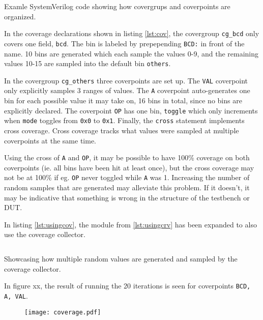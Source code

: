 \documentclass[journal]{IEEEtran}
\begin{document}
\begin{listing}[htbp]
\inputminted{systemverilog}{snippets/Cover.svh}
\caption{Examle SystemVerilog code showing how covergrups and coverpoints are organized.}
\label{lst:cov}
\end{listing}

In the coverage declarations shown in listing \ref{lst:cov}, the covergroup \texttt{cg\_bcd} only covers one field, \texttt{bcd}. The bin is labeled by prepepending \texttt{BCD:} in front of the name. 10 bins are generated which each sample the values 0-9, and the remaining values 10-15 are sampled into the default bin \texttt{others}. 

In the covergroup \texttt{cg\_others} three coverpoints are set up. The \texttt{VAL} coverpoint only explicitly samples 3 ranges of values. The \texttt{A} coverpoint auto-generates one bin for each possible value it may take on, 16 bins in total, since no bins are explicitly declared. The coverpoint \texttt{OP} has one bin, \texttt{toggle} which only increments when \texttt{mode} toggles from \texttt{0x0} to \texttt{0x1}. Finally, the \texttt{cross} statement implements cross coverage. Cross coverage tracks what values were sampled at multiple coverpoints at the same time.

Using the cross of \texttt{A} and \texttt{OP}, it may be possible to have 100\% coverage on both coverpoints (ie. all bins have been hit at least once), but the cross coverage may not be at 100\% if eg. \texttt{OP} never toggled while \texttt{A} was 1. Increasing the number of random samples that are generated may alleviate this problem. If it doesn't, it may be indicative that something is wrong in the structure of the testbench or DUT.

In listing \ref{lst:usingcov}, the module from \cref{lst:usingcrv} has been expanded to also use the coverage collector.
\begin{listing}
	\inputminted{systemverilog}{snippets/top.sv}
	\caption{Showcasing how multiple random values are generated and sampled by the coverage collector.}
	\label{lst:usingcov}
\end{listing}

In figure xx, the result of running the 20 iterations is seen for coverpoints \texttt{BCD, A, VAL}. 

\begin{figure}
	\centering
	\texttt{[image: coverage.pdf]}
\end{figure}
\end{document}
